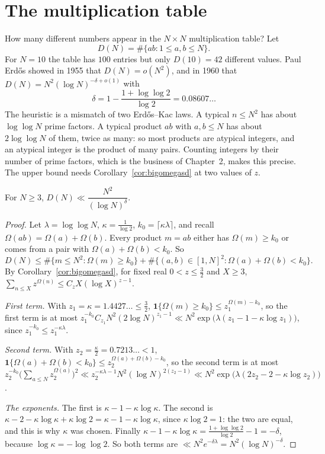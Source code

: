 \section{The multiplication table}\label{sec:table}

How many different numbers appear in the $N\times N$ multiplication table? Let
\[
D(N)=\#\{ab:1\le a,b\le N\}.
\]
For $N=10$ the table has $100$ entries but only $D(10)=42$ different values. Paul Erd\H{o}s showed in 1955 that $D(N)=o(N^2)$, and in 1960 that $D(N)=N^2(\log N)^{-\delta+o(1)}$ with
\[
\delta=1-\frac{1+\log\log2}{\log2}=0.08607\ldots
\]
The heuristic is a mismatch of two Erd\H{o}s--Kac laws. A typical $n\le N^2$ has about $\log\log N$ prime factors. A typical product $ab$ with $a,b\le N$ has about $2\log\log N$ of them, twice as many: so most products are atypical integers, and an atypical integer is the product of many pairs. Counting integers by their number of prime factors, which is the business of Chapter~2, makes this precise. The upper bound needs Corollary~\ref{cor:bigomegasd} at two values of $z$.

\begin{theorem}[Erd\H{o}s, 1960]\label{thm:multtable}
For $N\ge3$, $D(N)\ll\dfrac{N^2}{(\log N)^\delta}$.
\end{theorem}
\begin{proof}
Let $\lambda=\log\log N$, $\kappa=\frac1{\log2}$, $k_0=\lceil\kappa\lambda\rceil$, and recall $\Omega(ab)=\Omega(a)+\Omega(b)$. Every product $m=ab$ either has $\Omega(m)\ge k_0$ or comes from a pair with $\Omega(a)+\Omega(b)<k_0$. So
\[
D(N)\le\#\{m\le N^2:\Omega(m)\ge k_0\}+\#\{(a,b)\in[1,N]^2:\Omega(a)+\Omega(b)<k_0\}.
\]
By Corollary~\ref{cor:bigomegasd}, for fixed real $0<z\le\frac32$ and $X\ge3$, $\sum_{n\le X}z^{\Omega(n)}\le C_zX(\log X)^{z-1}$.

\emph{First term.} With $z_1=\kappa=1.4427\ldots\le\frac32$, $\mathbf 1\{\Omega(m)\ge k_0\}\le z_1^{\Omega(m)-k_0}$, so the first term is at most $z_1^{-k_0}C_{z_1}N^2(2\log N)^{z_1-1}\ll N^2\exp\bigl(\lambda(z_1-1-\kappa\log z_1)\bigr)$, since $z_1^{-k_0}\le z_1^{-\kappa\lambda}$.

\emph{Second term.} With $z_2=\frac\kappa2=0.7213\ldots<1$, $\mathbf 1\{\Omega(a)+\Omega(b)<k_0\}\le z_2^{\Omega(a)+\Omega(b)-k_0}$, so the second term is at most $z_2^{-k_0}\bigl(\sum_{a\le N}z_2^{\Omega(a)}\bigr)^2\ll z_2^{-\kappa\lambda-1}N^2(\log N)^{2(z_2-1)}\ll N^2\exp\bigl(\lambda(2z_2-2-\kappa\log z_2)\bigr)$.

\emph{The exponents.} The first is $\kappa-1-\kappa\log\kappa$. The second is $\kappa-2-\kappa\log\kappa+\kappa\log2=\kappa-1-\kappa\log\kappa$, since $\kappa\log2=1$: the two are equal, and this is why $\kappa$ was chosen. Finally $\kappa-1-\kappa\log\kappa=\frac{1+\log\log2}{\log2}-1=-\delta$, because $\log\kappa=-\log\log2$. So both terms are $\ll N^2e^{-\delta\lambda}=N^2(\log N)^{-\delta}$.
\end{proof}

